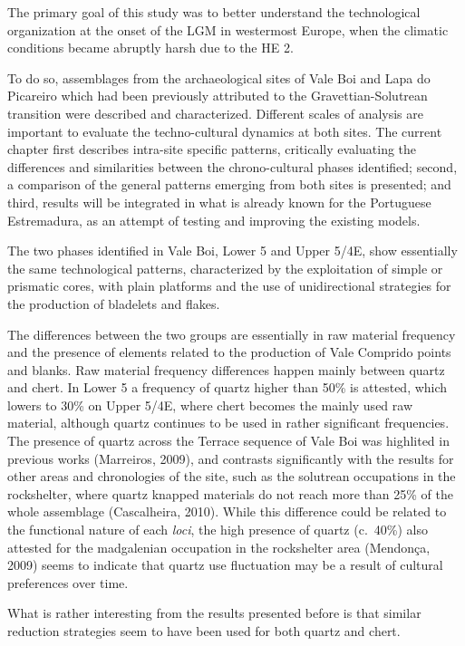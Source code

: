 \documentclass[12pt,twoside]{reedthesis}
\begin{document}
The primary goal of this study was to better understand the technological organization at the onset of the LGM in westermost Europe, when the climatic conditions became abruptly harsh due to the HE 2.

To do so, assemblages from the archaeological sites of Vale Boi and Lapa do Picareiro which had been previously attributed to the Gravettian-Solutrean transition were described and characterized. Different scales of analysis are important to evaluate the techno-cultural dynamics at both sites. The current chapter first describes intra-site specific patterns, critically evaluating the differences and similarities between the chrono-cultural phases identified; second, a comparison of the general patterns emerging from both sites is presented; and third, results will be integrated in what is already known for the Portuguese Estremadura, as an attempt of testing and improving the existing models.

The two phases identified in Vale Boi, Lower 5 and Upper 5/4E, show essentially the same technological patterns, characterized by the exploitation of simple or prismatic cores, with plain platforms and the use of unidirectional strategies for the production of bladelets and flakes.

The differences between the two groups are essentially in raw material frequency and the presence of elements related to the production of Vale Comprido points and blanks. Raw material frequency differences happen mainly between quartz and chert. In Lower 5 a frequency of quartz higher than 50\% is attested, which lowers to 30\% on Upper 5/4E, where chert becomes the mainly used raw material, although quartz continues to be used in rather significant frequencies. The presence of quartz across the Terrace sequence of Vale Boi was highlited in previous works (Marreiros, 2009), and contrasts significantly with the results for other areas and chronologies of the site, such as the solutrean occupations in the rockshelter, where quartz knapped materials do not reach more than 25\% of the whole assemblage (Cascalheira, 2010). While this difference could be related to the functional nature of each \emph{loci}, the high presence of quartz (c.~40\%) also attested for the madgalenian occupation in the rockshelter area (Mendonça, 2009) seems to indicate that quartz use fluctuation may be a result of cultural preferences over time.

What is rather interesting from the results presented before is that similar reduction strategies seem to have been used for both quartz and chert.
\end{document}
